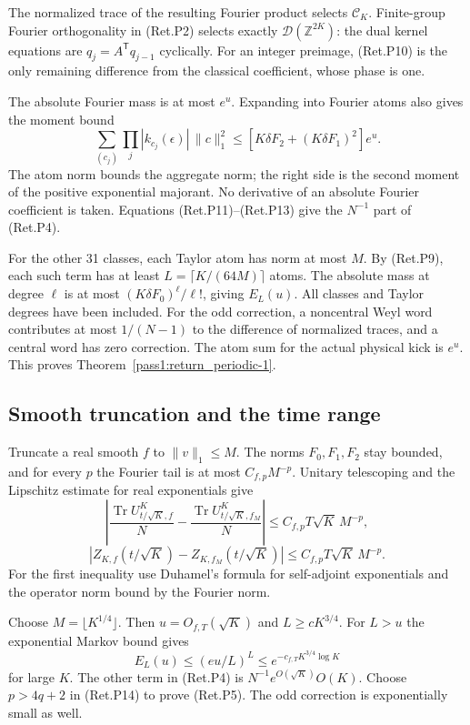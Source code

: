 The normalized trace of the resulting Fourier product selects
\(\mathcal C_K\). Finite-group Fourier orthogonality in (Ret.P2)
selects exactly \(\mathcal D(\mathbb Z^{2K})\):
the dual kernel equations are \(q_j=A^{\mathsf T}q_{j-1}\) cyclically.
For an integer preimage, (Ret.P10) is the only remaining difference
from the classical coefficient, whose phase is one.

The absolute Fourier mass is at most \(e^u\).
Expanding into Fourier atoms also gives the moment bound
\[
 \sum_{(c_j)}\prod_j|k_{c_j}(\epsilon)|\,\|c\|_1^2
       \le[K\delta F_2+(K\delta F_1)^2]e^u.                 \tag{Ret.P13}
\]
The atom norm bounds the aggregate norm; the right side is the second
moment of the positive exponential majorant. No derivative of an
absolute Fourier coefficient is taken.
Equations (Ret.P11)--(Ret.P13) give the \(N^{-1}\) part of (Ret.P4).

For the other 31 classes, each Taylor atom has norm at most \(M\).
By (Ret.P9), each such term has at least \(L=\lceil K/(64M)\rceil\)
atoms. The absolute mass at degree \(\ell\) is at most
\((K\delta F_0)^\ell/\ell!\), giving \(E_L(u)\).
All classes and Taylor degrees have been included.
For the odd correction, a noncentral Weyl word contributes at most
\(1/(N-1)\) to the difference of normalized traces, and a central word
has zero correction. The atom sum for the actual physical kick is \(e^u\).
This proves Theorem~\ref{pass1:return_periodic-1}.

\hypertarget{smooth-truncation-and-the-time-range}{%
\subsection{Smooth truncation and the time range}\label{smooth-truncation-and-the-time-range}}

Truncate a real smooth \(f\) to \(\|v\|_1\le M\).
The norms \(F_0,F_1,F_2\) stay bounded, and for every \(p\) the Fourier
tail is at most \(C_{f,p}M^{-p}\).
Unitary telescoping and the Lipschitz estimate for real exponentials give
\[
 \left|\frac{\operatorname{Tr}U_{t/\sqrt K,f}^K}{N}
       -\frac{\operatorname{Tr}U_{t/\sqrt K,f_M}^K}{N}\right|
 \le C_{f,p}T\sqrt K\,M^{-p},
\]
\[
 |Z_{K,f}(t/\sqrt K)-Z_{K,f_M}(t/\sqrt K)|
                         \le C_{f,p}T\sqrt K\,M^{-p}.       \tag{Ret.P14}
\]
For the first inequality use Duhamel's formula for self-adjoint
exponentials and the operator norm bound by the Fourier norm.

Choose \(M=\lfloor K^{1/4}\rfloor\).
Then \(u=O_{f,T}(\sqrt K)\) and \(L\ge cK^{3/4}\).
For \(L>u\) the exponential Markov bound gives
\[
 E_L(u)\le(eu/L)^L\le e^{-c_{f,T}K^{3/4}\log K}
\]
for large \(K\). The other term in (Ret.P4) is
\(N^{-1}e^{O(\sqrt K)}O(K)\).
Choose \(p>4q+2\) in (Ret.P14) to prove (Ret.P5).
The odd correction is exponentially small as well.

